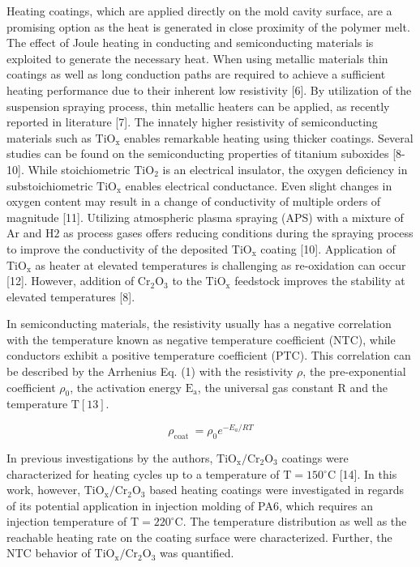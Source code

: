 \documentclass[10pt]{article}
\begin{document}
Heating coatings, which are applied directly on the mold cavity surface, are a promising option as the heat is generated in close proximity of the polymer melt. The effect of Joule heating in conducting and semiconducting materials is exploited to generate the necessary heat. When using metallic materials thin coatings as well as long conduction paths are required to achieve a sufficient heating performance due to their inherent low resistivity [6]. By utilization of the suspension spraying process, thin metallic heaters can be applied, as recently reported in literature [7]. The innately higher resistivity of semiconducting materials such as $\mathrm{TiO}_{\mathrm{x}}$ enables remarkable heating using thicker coatings. Several studies can be found on the semiconducting properties of titanium suboxides [8-10]. While stoichiometric $\mathrm{TiO}_{2}$ is an electrical insulator, the oxygen deficiency in substoichiometric $\mathrm{TiO}_{\mathrm{x}}$ enables electrical conductance. Even slight changes in oxygen content may result in a change of conductivity of multiple orders of magnitude [11]. Utilizing atmospheric plasma spraying (APS) with a mixture of $\mathrm{Ar}$ and $\mathrm{H} 2$ as process gases offers reducing conditions during the spraying process to improve the conductivity of the deposited $\mathrm{TiO}_{\mathrm{x}}$ coating [10]. Application of $\mathrm{TiO}_{\mathrm{x}}$ as heater at elevated temperatures is challenging as re-oxidation can occur [12]. However, addition of $\mathrm{Cr}_{2} \mathrm{O}_{3}$ to the $\mathrm{TiO}_{\mathrm{x}}$ feedstock improves the stability at elevated temperatures [8].

In semiconducting materials, the resistivity usually has a negative correlation with the temperature known as negative temperature coefficient (NTC), while conductors exhibit a positive temperature coefficient (PTC). This correlation can be described by the Arrhenius Eq. (1) with the resistivity $\rho$, the pre-exponential coefficient $\rho_{0}$, the activation energy $\mathrm{E}_{\mathrm{a}}$, the universal gas constant $\mathrm{R}$ and the temperature $\mathrm{T}[13]$.


\begin{equation*}
\rho_{\text {coat }}=\rho_{0} e^{-E_{a} / R T} \tag{1}
\end{equation*}


In previous investigations by the authors, $\mathrm{TiO}_{\mathrm{x}} / \mathrm{Cr}_{2} \mathrm{O}_{3}$ coatings were characterized for heating cycles up to a temperature of $\mathrm{T}=150{ }^{\circ} \mathrm{C}$ [14]. In this work, however, $\mathrm{TiO}_{\mathrm{x}} / \mathrm{Cr}_{2} \mathrm{O}_{3}$ based heating coatings were investigated in regards of its potential application in injection molding of PA6, which requires an injection temperature of $\mathrm{T}=220^{\circ} \mathrm{C}$. The temperature distribution as well as the reachable heating rate on the coating surface were characterized. Further, the NTC behavior of $\mathrm{TiO}_{\mathrm{x}} / \mathrm{Cr}_{2} \mathrm{O}_{3}$ was quantified.
\end{document}
